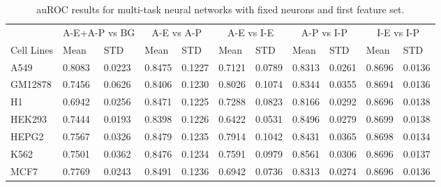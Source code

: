 \begin{table}[!htbp]
\centering
\caption{auROC results for multi-task neural networks with fixed neurons and first feature set.}
\label{tab:fixed_neurons_auroc}
\hspace*{-2.2cm}
\begin{tabular}[t]{*{11}{l}}
\toprule
 & \multicolumn{2}{c}{A-E+A-P vs BG} & \multicolumn{2}{c}{A-E vs A-P} & \multicolumn{2}{c}{A-E vs I-E} & \multicolumn{2}{c}{A-P vs I-P} & \multicolumn{2}{c}{I-E vs I-P} \\
\cmidrule(lr){2-3}
\cmidrule(lr){4-5}
\cmidrule(lr){6-7}
\cmidrule(lr){8-9}
\cmidrule(lr){10-11}
Cell Lines & Mean & STD & Mean & STD & Mean & STD & Mean & STD & Mean & STD \\
\midrule
A549  & 0.8083 & 0.0223 & 0.8475 & 0.1227 & 0.7121 & 0.0789 & 0.8313 & 0.0261 & 0.8696 & 0.0136\\
GM12878  & 0.7456 & 0.0626 & 0.8406 & 0.1230 & 0.8026 & 0.1074 & 0.8344 & 0.0355 & 0.8694 & 0.0136\\
H1  & 0.6942 & 0.0256 & 0.8471 & 0.1225 & 0.7288 & 0.0823 & 0.8166 & 0.0292 & 0.8696 & 0.0138\\
HEK293  & 0.7444 & 0.0193 & 0.8398 & 0.1226 & 0.6422 & 0.0531 & 0.8496 & 0.0279 & 0.8699 & 0.0138\\
HEPG2  & 0.7567 & 0.0326 & 0.8479 & 0.1235 & 0.7914 & 0.1042 & 0.8431 & 0.0365 & 0.8698 & 0.0134\\
K562  & 0.7501 & 0.0362 & 0.8476 & 0.1234 & 0.7591 & 0.0979 & 0.8561 & 0.0306 & 0.8696 & 0.0137\\
MCF7  & 0.7769 & 0.0243 & 0.8491 & 0.1236 & 0.6942 & 0.0736 & 0.8313 & 0.0274 & 0.8696 & 0.0136\\
\bottomrule
\end{tabular}
\hspace*{-2.2cm}
\end{table}
